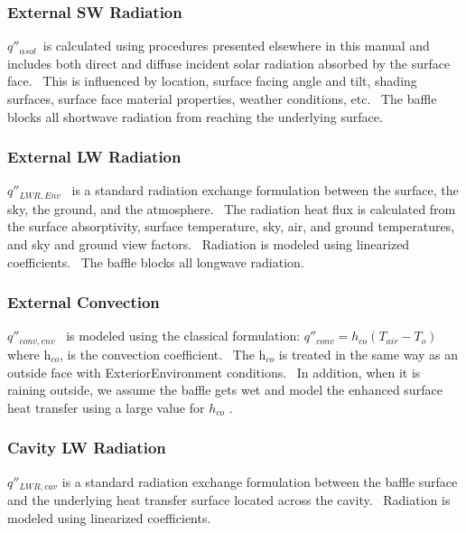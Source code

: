 \subsubsection{External SW Radiation}\label{external-sw-radiation}

\(q''_{\alpha sol}\)~is calculated using procedures presented elsewhere in this manual and includes both direct and diffuse incident solar radiation absorbed by the surface face.~ This is influenced by location, surface facing angle and tilt, shading surfaces, surface face material properties, weather conditions, etc.~ The baffle blocks all shortwave radiation from reaching the underlying surface.

\subsubsection{External LW Radiation}\label{external-lw-radiation}

\({q''_{LWR,Env}}\) ~is a standard radiation exchange formulation between the surface, the sky, the ground, and the atmosphere.~ The radiation heat flux is calculated from the surface absorptivity, surface temperature, sky, air, and ground temperatures, and sky and ground view factors.~ Radiation is modeled using linearized coefficients. ~The baffle blocks all longwave radiation.

\subsubsection{External Convection}\label{external-convection}

\(q''_{conv,env}\) ~is modeled using the classical formulation: \(q''_{conv}  = h_{co}(T_{air} - T_{o})\) where h\(_{co}\), is the convection coefficient.~ The h\(_{co}\) is treated in the same way as an outside face with ExteriorEnvironment conditions.~ In addition, when it is raining outside, we assume the baffle gets wet and model the enhanced surface heat transfer using a large value for \({h_{co}}\) .

\subsubsection{Cavity LW Radiation}\label{cavity-lw-radiation}

\({q''_{LWR,cav}}\) is a standard radiation exchange formulation between the baffle surface and the underlying heat transfer surface located across the cavity.~ Radiation is modeled using linearized coefficients.

